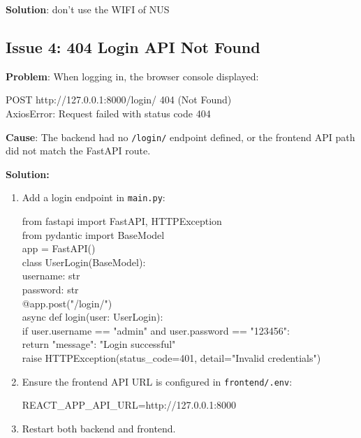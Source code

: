 \documentclass[12pt, a4paper]{article}
\begin{document}
        \textbf{Solution}: don't use the WIFI of NUS

    \subsection{Issue 4: 404 Login API Not Found}
        \textbf{Problem}: When logging in, the browser console displayed:
        
        \begin{monoblock}
            POST http://127.0.0.1:8000/login/ 404 (Not Found)\\
            AxiosError: Request failed with status code 404
        \end{monoblock}
        
        \textbf{Cause}: The backend had no \texttt{/login/} endpoint defined, or the frontend API path did not match the FastAPI route.
        
        \textbf{Solution:}
        \begin{enumerate}
            \item Add a login endpoint in \texttt{main.py}: 
            
                \begin{monoblock}
                    from fastapi import FastAPI, HTTPException\\
                    from pydantic import BaseModel\\
                    app = FastAPI()\\
                    class UserLogin(BaseModel):\\
                        username: str\\
                        password: str\\
                    @app.post("/login/")\\
                    async def login(user: UserLogin):\\
                        if user.username == "admin" and user.password == "123456":\\
                            return {"message": "Login successful"}\\
                        raise HTTPException(status\_code=401, detail="Invalid credentials")\\
                \end{monoblock}
                
            \item Ensure the frontend API URL is configured in \texttt{frontend/.env}:
            
                \begin{monoblock}
                    REACT\_APP\_API\_URL=http://127.0.0.1:8000
                \end{monoblock}
                
            \item Restart both backend and frontend. 
        \end{enumerate}
        
\end{document}
